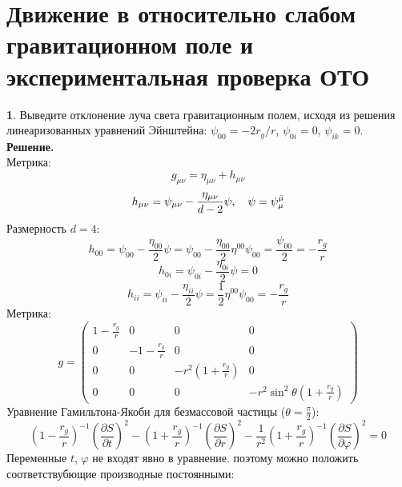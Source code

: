 \documentclass[12pt]{article}
\theoremstyle{definition}
\newtheorem{zad}{}[section]
\begin{document}
\section{Движение в относительно слабом гравитационном поле и экспериментальная проверка ОТО}
\begin{zad}
Выведите отклонение луча света гравитационным полем, исходя из решения линеаризованных уравнений Эйнштейна: $\psi_{00} = -2r_g/r$, $\psi_{0i} = 0$, $\psi_{ik} = 0$.\\
\textbf{Решение.}\\
Метрика:
\begin{equation}
    g_{\mu\nu}=\eta_{\mu\nu}+h_{\mu\nu}
\end{equation}
\begin{equation}
    h_{\mu\nu}=\psi_{\mu\nu}-\frac{\eta_{\mu\nu}}{d-2}\psi,\quad \psi=\psi^{\Bar{\mu}}_\mu
\end{equation}
Размерность $d=4$:
\begin{equation}
    h_{00}=\psi_{00}-\frac{\eta_{00}}{2}\psi=\psi_{00}-\frac{\eta_{00}}{2}\eta^{00}\psi_{00}=\frac{\psi_{00}}{2}=-\frac{r_g}{r}
\end{equation}
\begin{equation}
    h_{0i}=\psi_{0i}-\frac{\eta_{0i}}{2}\psi=0
\end{equation}
\begin{equation}
    h_{ii}=\psi_{ii}-\frac{\eta_{ii}}{2}\psi=\frac{1}{2}\eta^{00}\psi_{00}=-\frac{r_g}{r}
\end{equation}
Метрика:
\begin{equation}
    g=\begin{pmatrix}
    1-\frac{r_g}{r} & 0 & 0 & 0\\
    0 & -1-\frac{r_g}{r} & 0 & 0\\
    0 & 0 & -r^2\left(1+\frac{r_g}{r}\right) & 0\\
    0 & 0 & 0 & -r^2\sin^2\theta\left(1+\frac{r_g}{r}\right)
    \end{pmatrix}
\end{equation}
Уравнение Гамильтона-Якоби для безмассовой частицы ($\theta=\frac{\pi}{2}$):
\begin{equation}
    \left(1-\frac{r_g}{r}\right)^{-1}\left(\frac{\partial S}{\partial t}\right)^2-\left(1+\frac{r_g}{r}\right)^{-1}\left(\frac{\partial S}{\partial r}\right)^2-\frac{1}{r^2}\left(1+\frac{r_g}{r}\right)^{-1}\left(\frac{\partial S}{\partial\varphi}\right)^2=0
\end{equation}
Переменные $t$, $\varphi$ не входят явно в уравнение. поэтому можно положить соответствубющие производные постоянными:

\end{zad}
\end{document}

